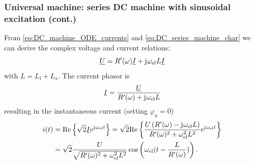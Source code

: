 \begin{frame}
	\frametitle{Universal machine: series DC machine with sinusoidal excitation (cont.)}
		From \eqref{eq:DC_machine_ODE_currents} and \eqref{eq:DC_series_machine_char} we can derive the complex voltage and current relations:
		\begin{equation}
			\underline{U} = R'(\omega)\underline{I} + \mathrm{j}\mkern1mu \omega_\mathrm{el} L \underline{I}
		\end{equation}
		with $L = L_\mathrm{f}+L_\mathrm{a}$. \pause The current phasor is
		\begin{equation}
			\underline{I} = \frac{\underline{U}}{R'(\omega) + \mathrm{j}\mkern1mu \omega_\mathrm{el} L}
		\end{equation} \pause
		resulting in the instantaneous current (setting $\varphi_{\mathrm{u}}=0$)
		\begin{align}
			i(t) &= \mathrm{Re}\left\{ \sqrt{2}\underline{I} e^{\mathrm{j}\mkern1mu\omega_\mathrm{el}t}\right\}=\sqrt{2}\mathrm{Re}\left\{ \frac{U\left(R'(\omega)-\mathrm{j}\mkern1mu\omega_\mathrm{el}L\right)}{R'(\omega)^2+\omega_\mathrm{el}^2L^2} e^{\mathrm{j}\mkern1mu\omega_\mathrm{el}t}\right\}\\
			& =\sqrt{2}\frac{U}{\sqrt{R'(\omega)^2+\omega_\mathrm{el}^2L^2}}\cos\left(\omega_\mathrm{el}(t-\frac{L}{R'(\omega)})\right).
		\end{align} 
\end{frame}


